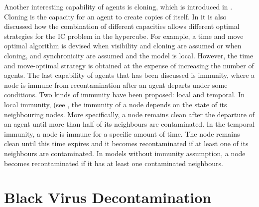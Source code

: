 Another interesting capability of agents is cloning, which is introduced in \cite{M.Huang1}. Cloning is the capacity for an agent to create copies of itself. In \cite{M.Huang1} it is also discussed how the combination of different capacities allows different optimal strategies for the IC problem in the hypercube. For example, a  time and move optimal algorithm is devised  when visibility and cloning are assumed or when cloning,  and synchronicity are assumed and the model is  local. However, the time and move-optimal strategy is obtained at the expense of increasing the number of agents.
The last capability of agents that has been discussed is immunity, where a node is immune from recontamination after an agent departs under some conditions. Two kinds of immunity have been proposed: local and temporal. In local immunity, (see
\cite{Flocchini6,N.Santoro}, the immunity of a node depends on the state of its neighbouring nodes. More specifically, a node remains clean after the departure of an agent until more than half of its neighbours are contaminated. In the temporal immunity, a node is immune for a specific amount of time. The node remains clean until this time expires and it becomes recontaminated if at least one of its neighbours are contaminated. In models without immunity assumption, a node becomes recontaminated if it has at least one contaminated neighbours.

\section{Black Virus Decontamination}
